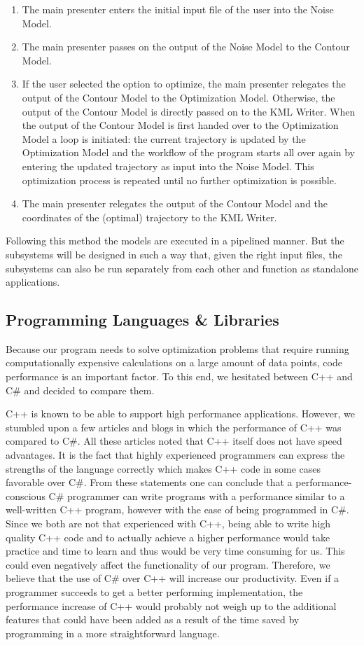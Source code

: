 \begin{enumerate}
\item The main presenter enters the initial input file of the user into the Noise Model.
\item The main presenter passes on the output of the Noise Model to the Contour Model.
\item If the user selected the option to optimize, the main presenter relegates the output of the Contour Model to the Optimization Model. Otherwise, the output of the Contour Model is directly passed on to the KML Writer. When the output of the Contour Model is first handed over to the Optimization Model a loop is initiated: the current trajectory is updated by the Optimization Model and the workflow of the program starts all over again by entering the updated trajectory as input into the Noise Model. This optimization process is repeated until no further optimization is possible. 
\item The main presenter relegates the output of the Contour Model and the coordinates of the (optimal) trajectory to the KML Writer.
\end{enumerate}

Following this method the models are executed in a pipelined manner. But the subsystems will be designed in such a way that, given the right input files, the subsystems can also be run separately from each other and function as standalone applications.

\subsection{Programming Languages \& Libraries}

Because our program needs to solve optimization problems that require running computationally expensive calculations on a large amount of data points, code performance is an important factor. To this end, we hesitated between C++ and C\# and decided to compare them. 

C++ is known to be able to support high performance applications. However, we stumbled upon a few articles and blogs in which the performance of C++ was compared to C\#. All these articles noted that C++ itself does not have speed advantages. It is the fact that highly experienced programmers can express the strengths of the  language correctly which makes C++ code in some cases favorable over C\#. From these statements one can conclude that a performance-conscious C\# programmer can write programs with a performance similar to a well-written C++ program, however with the ease of being programmed in C\#. Since we both are not that experienced with C++, being able to write high quality C++ code and to actually achieve a higher performance would take practice and time to learn and thus would be very time consuming for us. This could even negatively affect the functionality of our program. Therefore, we believe that the use of C\# over C++ will increase our productivity. Even if a programmer succeeds to get a better performing implementation, the performance increase of C++ would probably not weigh up to the additional features that could have been added as a result of the time saved by programming in a more straightforward language. 

